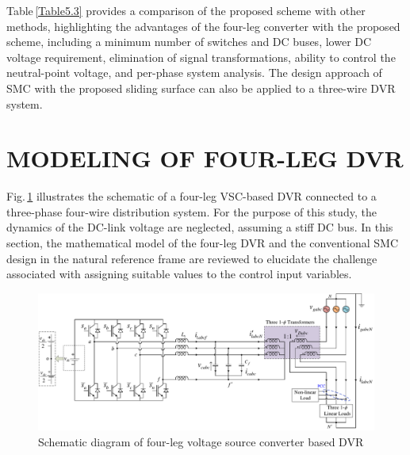 Table\,\ref{Table5.3} provides a comparison of the proposed scheme with other methods, highlighting the advantages of the four-leg converter with the proposed scheme, including a minimum number of switches and DC buses, lower DC voltage requirement, elimination of signal transformations, ability to control the neutral-point voltage, and per-phase system analysis. The design approach of SMC with the proposed sliding surface can also be applied to a three-wire DVR system.

\vspace*{-0.5cm}\section{MODELING OF FOUR-LEG DVR}

Fig.\,\ref{fig5.1} illustrates the schematic of a four-leg VSC-based DVR connected to a three-phase four-wire distribution system. For the purpose of this study, the dynamics of the DC-link voltage are neglected, assuming a stiff DC bus. In this section, the mathematical model of the four-leg DVR and the conventional SMC design in the natural reference frame are reviewed to elucidate the challenge associated with assigning suitable values to the control input variables.
\begin{figure}[h!]\centering
	\includegraphics[scale=0.6	]{figures/Chapter_5/Mine/4leg_DVR.pdf}
	\caption{Schematic diagram of four-leg voltage source converter based DVR} %
	\label{fig5.1}
\end{figure} 
\vspace*{-1cm} 
